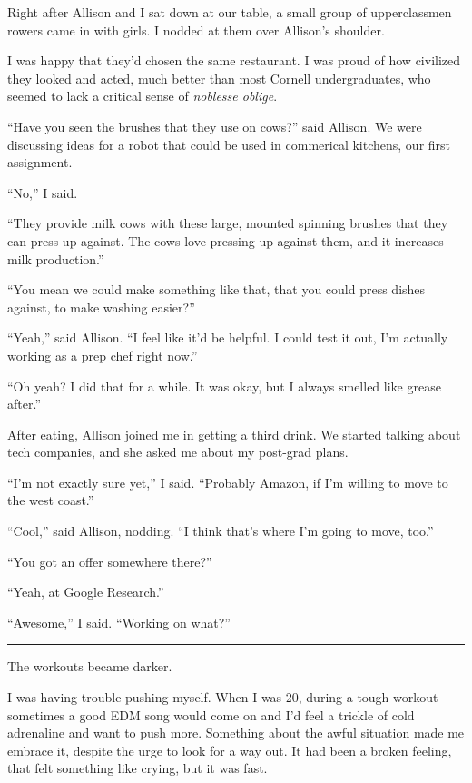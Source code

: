 Right after Allison and I sat down at our table, a small group of upperclassmen
rowers came in with girls.  I nodded at them over Allison's shoulder.  

I was happy that they'd chosen the same restaurant.  I was proud of how
civilized they looked and acted, much better than most Cornell undergraduates,
who seemed to lack a critical sense of \textit{noblesse oblige}.

``Have you seen the brushes that they use on cows?'' said Allison.  We were
discussing ideas for a robot that could be used in commerical kitchens, our
first assignment.

``No,'' I said.

``They provide milk cows with these large, mounted spinning brushes that they
can press up against.  The cows love pressing up against them, and it increases
milk production.'' 

``You mean we could make something like that, that you could press dishes
against, to make washing easier?''

``Yeah,'' said Allison.  ``I feel like it'd be helpful.  I could test it out,
I'm actually working as a prep chef right now.''

``Oh yeah?  I did that for a while.  It was okay, but I always smelled like
grease after.''

After eating, Allison joined me in getting a third drink.  We started talking
about tech companies, and she asked me about my post-grad plans.  

``I'm not exactly sure yet,'' I said.  ``Probably Amazon, if I'm willing to move
to the west coast.''

``Cool,'' said Allison, nodding.  ``I think that's where I'm going to move,
too.''

``You got an offer somewhere there?''

``Yeah, at Google Research.''

``Awesome,'' I said.  ``Working on what?''

\plainfancybreak{12pt}{2}{* * *}

The workouts became darker.  

I was having trouble pushing myself.  When I was 20, during a tough workout
sometimes a good EDM song would come on and I'd feel a trickle of cold
adrenaline and want to push more.  Something about the awful situation made me
embrace it, despite the urge to look for a way out.  It had been a broken
feeling, that felt something like crying, but it was fast.

